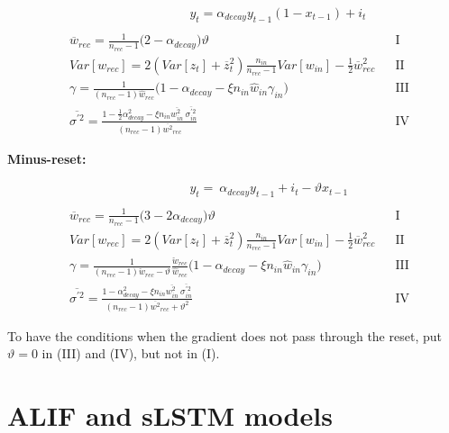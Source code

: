 {\small
\begin{align*}
&\hspace{4cm} y_t =  \alpha_{decay}y_{t-1}(1 - x_{t-1}) +i_t\\  \nonumber \\
    &\overline{w}_{rec}=
    \frac{1}{n_{rec}-1}\Big(2-\alpha_{decay}\Big)\vartheta && \text{I}\\
    &Var[w_{rec}]  =  2(Var[z_t] + \overline{z}_t^2)\frac{n_{in}}{n_{rec}-1}Var[w_{in}] - \frac{1}{2}\overline{w}_{rec}^2 && \text{II}\\
    &\gamma=   \frac{1}{(n_{rec}-1)\hat{w}_{rec}}\Big( 1 -\alpha_{decay}-\xi n_{in}\hat{w}_{in} \gamma_{in} \Big)&& \text{III}\\
    &\overline{\sigma^{\prime 2}} = \frac{1-\frac{1}{2}\alpha_{decay}^2-\xi n_{in}\overline{w_{in}^2} \ \overline{\sigma^{\prime 2}_{in}}}{(n_{rec}-1)\overline{w^2}_{rec}}  && \text{IV}
\end{align*}
}

\vspace{.7cm}
\textbf{Minus-reset:}
\vspace{-.8cm}

{\small
\begin{align*}
&\hspace{4cm} y_t = \ \alpha_{decay}y_{t-1} +i_t -\vartheta x_{t-1} \\ \nonumber \\
    &\overline{w}_{rec} = 
    \frac{1}{n_{rec}-1}\Big(3-2\alpha_{decay}\Big) \vartheta && \text{I}\\
    &Var[w_{rec}]  =  2(Var[z_t] + \overline{z}_t^2)\frac{n_{in}}{n_{rec}-1}Var[w_{in}] - \frac{1}{2}\overline{w}_{rec}^2 && \text{II}\\
    &\gamma =    \frac{1}{(n_{rec}-1)\check{w}_{rec}-\vartheta}\frac{\check{w}_{rec}}{\hat{w}_{rec}}\Big( 1 -\alpha_{decay}-\xi n_{in}\hat{w}_{in} \gamma_{in} \Big)&& \text{III}\\
    &\overline{\sigma^{\prime2}} =   \frac{1-\alpha_{decay}^2-\xi n_{in}\overline{w_{in}^2}\ \overline{\sigma_{in}^{\prime2}}}{(n_{rec}-1)\overline{w^2}_{rec} + \vartheta^2}  && \text{IV}
\end{align*}
}

To have the conditions when the gradient does not pass through the reset, put $\vartheta=0$ in (III) and (IV), but not in (I).

\section{ALIF and sLSTM models}
\label{app:alifsLSTM}

